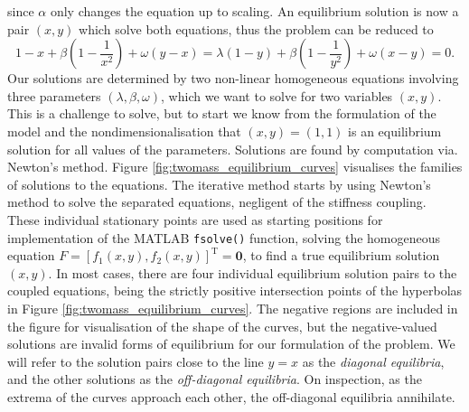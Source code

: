 \documentclass{article}
\begin{document}
since \(\alpha\) only changes the equation up to scaling. 
An equilibrium solution is now a pair \((x,y)\) which solve both equations,
thus the problem can be reduced to
\begin{equation}
    1-x + \beta\left(1 - \frac{1}{x^2}\right) + \omega(y-x) = \lambda(1-y) + \beta\left(1 - \frac{1}{y^2}\right) + \omega(x-y) = 0.
    \label{eqn:twomass_noalpha_equilibrium_solutions}
\end{equation}
Our solutions are determined by two non-linear homogeneous equations involving three parameters \((\lambda, \beta, \omega)\), which we want to solve for two variables \((x,y)\).
This is a challenge to solve, but to start we know from the formulation of the model and the nondimensionalisation that \((x,y) = (1,1)\) is an equilibrium solution for all values of the parameters.
Solutions are found by computation via. Newton's method.
Figure \ref{fig:twomass_equilibrium_curves} visualises the families of solutions to the equations.
The iterative method starts by using Newton's method to solve the separated equations, negligent of the stiffness coupling.
These individual stationary points are used as starting positions for implementation of the MATLAB \texttt{fsolve()} function,
solving the homogeneous equation \(F = [f_1(x,y), f_2(x,y)]^\mathrm{T} = \mathbf{0}\),
to find a true equilibrium solution \((x,y)\).
In most cases, there are four individual equilibrium solution pairs to the coupled equations,
being the strictly positive intersection points of the hyperbolas in Figure \ref{fig:twomass_equilibrium_curves}.
The negative regions are included in the figure for visualisation of the shape of the curves,
but the negative-valued solutions are invalid forms of equilibrium for our formulation of the problem.
We will refer to the solution pairs close to the line $y=x$ as the \textit{diagonal equilibria},
and the other solutions as the \textit{off-diagonal equilibria}.
On inspection, as the extrema of the curves approach each other,
the off-diagonal equilibria annihilate. %
\end{document}
